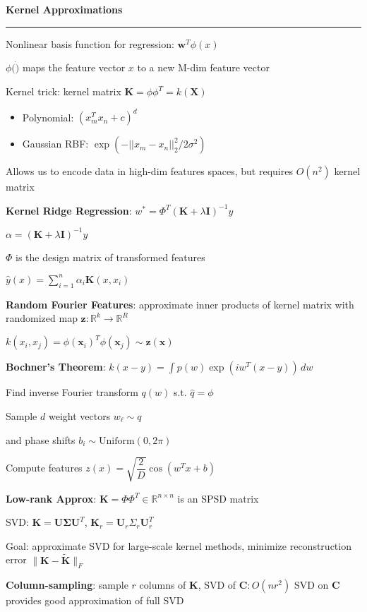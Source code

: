 \documentclass[8pt,letter,landscape]{article}
\newcommand{\sectiontitle}[1]{\textbf{\large #1}\vspace{0.2em}\hrule\vspace{0.5em}}
\begin{document}
\begin{multicols*}{3}
\sectiontitle{Kernel Approximations}
Nonlinear basis function for regression: $\mathbf{w}^T \phi(x)$

$\phi(\dot)$ maps the feature vector $x$ to a new M-dim feature vector

Kernel trick: kernel matrix $\mathbf{K} = \phi \phi^T = k(\mathbf{X})$

\begin{itemize}[leftmargin=*,nosep]
    \item Polynomial: $(x_m^T x_n + c)^d$
    \item Gaussian RBF: $\exp(-||x_m - x_n||_2^2 / 2\sigma^2)$
\end{itemize}

Allows us to encode data in high-dim features spaces, but requires $O(n^2)$ kernel matrix

\textbf{Kernel Ridge Regression}: $w^* = \Phi^T (\mathbf{K} + \lambda \mathbf{I})^{-1} y$

$\alpha = (\mathbf{K} + \lambda \mathbf{I})^{-1} y$

$\Phi$ is the design matrix of transformed features

$\hat{y}(x) = \sum_{i = 1}^n \alpha_i \mathbf{K}(x, x_i)$

\textbf{Random Fourier Features}: approximate inner products of kernel matrix with randomized map $\mathbf{z}: \mathbb{R}^k \rightarrow \mathbb{R}^R$

$k(x_i, x_j) = \phi(\mathbf{x}_i)^T \phi(\mathbf{x}_j) \sim \mathbf{z}(\mathbf{x})$

\textbf{Bochner's Theorem}: $k(x - y) = \int p(w) \exp(iw^T(x - y))\, dw$

Find inverse Fourier transform $q(w)$ s.t. $\hat{q} = \phi$

Sample $d$ weight vectors $w_\ell \sim q$

and phase shifts $b_i \sim \text{Uniform}(0, 2\pi)$

Compute features $z(x) = \sqrt{\dfrac{2}{D}} \cos(w^T x + b)$

\textbf{Low-rank Approx}: $\textbf{K} = \Phi \Phi^T \in \mathbb{R}^{n \times n}$ is an SPSD matrix

SVD: $\mathbf{K} = \mathbf{U} \mathbf{\Sigma} \mathbf{U}^T$, $\mathbf{K}_r = \mathbf{U}_r \Sigma_r \mathbf{U}_r^T$

Goal: approximate SVD for large-scale kernel methods, minimize reconstruction error $\|\mathbf{K} - \tilde{\mathbf{K}}\|_F$

\textbf{Column-sampling}: sample $r$ columns of $\mathbf{K}$, SVD of $\mathbf{C} : O(nr^2)$ SVD on $\mathbf{C}$ provides good approximation of full SVD


\end{multicols*}
\end{document}
